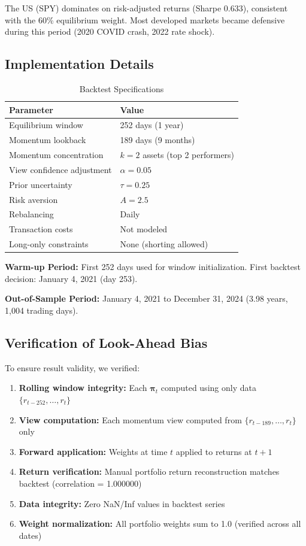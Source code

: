 \documentclass[12pt,a4paper]{article}
\begin{document}
The US (SPY) dominates on risk-adjusted returns (Sharpe 0.633), consistent with the 60\% equilibrium weight. Most developed markets became defensive during this period (2020 COVID crash, 2022 rate shock).

\subsection{Implementation Details}

\begin{table}[H]
\centering
\caption{Backtest Specifications}
\label{tab:specs}
\begin{tabular}{ll}
\toprule
\textbf{Parameter} & \textbf{Value} \\
\midrule
Equilibrium window & 252 days (1 year) \\
Momentum lookback & 189 days (9 months) \\
Momentum concentration & $k=2$ assets (top 2 performers) \\
View confidence adjustment & $\alpha = 0.05$ \\
Prior uncertainty & $\tau = 0.25$ \\
Risk aversion & $A = 2.5$ \\
Rebalancing & Daily \\
Transaction costs & Not modeled \\
Long-only constraints & None (shorting allowed) \\
\bottomrule
\end{tabular}
\end{table}

\textbf{Warm-up Period:} First 252 days used for window initialization. First backtest decision: January 4, 2021 (day 253).

\textbf{Out-of-Sample Period:} January 4, 2021 to December 31, 2024 (3.98 years, 1,004 trading days).

\subsection{Verification of Look-Ahead Bias}

To ensure result validity, we verified:

\begin{enumerate}
\item \textbf{Rolling window integrity:} Each $\boldsymbol{\pi}_t$ computed using only data $\{r_{t-252}, \ldots, r_t\}$
\item \textbf{View computation:} Each momentum view computed from $\{r_{t-189}, \ldots, r_t\}$ only
\item \textbf{Forward application:} Weights at time $t$ applied to returns at $t+1$
\item \textbf{Return verification:} Manual portfolio return reconstruction matches backtest (correlation = 1.000000)
\item \textbf{Data integrity:} Zero NaN/Inf values in backtest series
\item \textbf{Weight normalization:} All portfolio weights sum to 1.0 (verified across all dates)
\end{enumerate}
\end{document}
